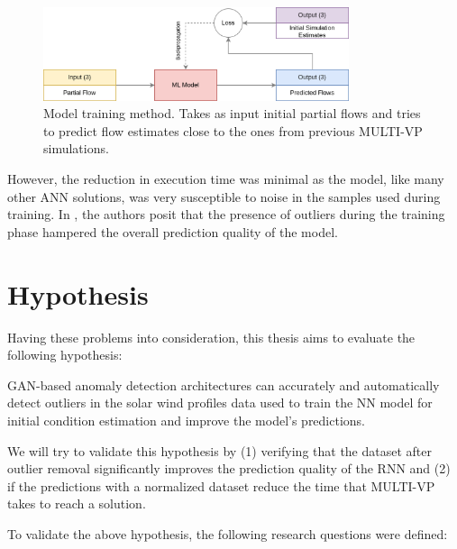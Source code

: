 \begin{figure}[!ht]
    \centering
    \includegraphics[width=0.8\textwidth]{figures/rnn_training.png}
    \caption[ML training phase]{Model training method. Takes as input initial partial flows and tries to predict flow estimates close to the ones from previous MULTI-VP simulations.\label{fig:rnn_train}}
\end{figure}

However, the reduction in execution time was minimal as the model, like many other ANN solutions, was very susceptible to noise in the samples used during training. In \cite{barros_InitialConditionEstimation_}, the authors posit that the presence of outliers during the training phase hampered the overall prediction quality of the model.


\section{Hypothesis}\label{sec:hypothesis}
Having these problems into consideration, this thesis aims to evaluate the following hypothesis:
\begin{adjustwidth}{2cm}{}
    GAN-based anomaly detection architectures can accurately and automatically detect outliers in the solar wind profiles data used to train the NN model for initial condition estimation and improve the model's predictions.
\end{adjustwidth}

We will try to validate this hypothesis by (1) verifying that the dataset after outlier removal significantly improves the prediction quality of the RNN and (2) if the predictions with a normalized dataset reduce the time that MULTI-VP takes to reach a solution.

To validate the above hypothesis, the following research questions were defined:

